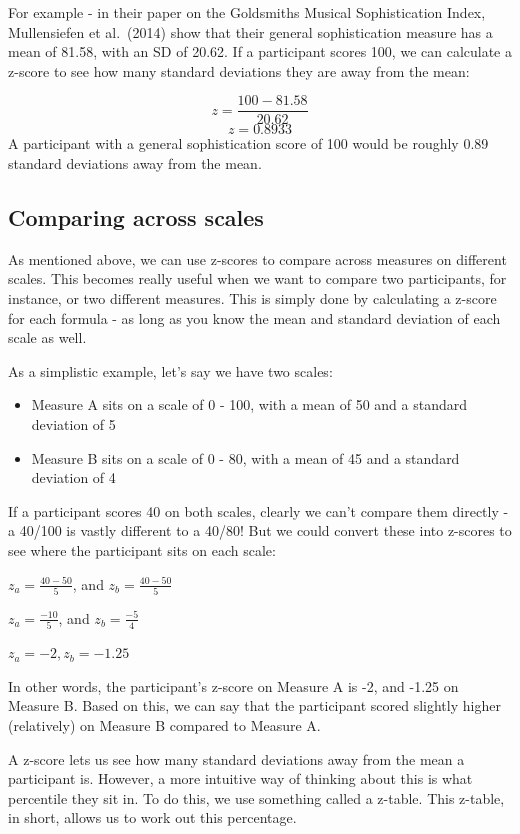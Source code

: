 \documentclass[
]{book}
\providecommand{\tightlist}{%
  \setlength{\itemsep}{0pt}\setlength{\parskip}{0pt}}
\begin{document}
For example - in their paper on the Goldsmiths Musical Sophistication Index, Mullensiefen et al.~(2014) show that their general sophistication measure has a mean of 81.58, with an SD of 20.62. If a participant scores 100, we can calculate a z-score to see how many standard deviations they are away from the mean:

\[
z = \frac{100 - 81.58}{20.62}
\]
\[
z = 0.8933
\]
A participant with a general sophistication score of 100 would be roughly 0.89 standard deviations away from the mean.

\hypertarget{comparing-across-scales}{%
\subsection{Comparing across scales}\label{comparing-across-scales}}

As mentioned above, we can use z-scores to compare across measures on different scales. This becomes really useful when we want to compare two participants, for instance, or two different measures. This is simply done by calculating a z-score for each formula - as long as you know the mean and standard deviation of each scale as well.

As a simplistic example, let's say we have two scales:

\begin{itemize}
\tightlist
\item
  Measure A sits on a scale of 0 - 100, with a mean of 50 and a standard deviation of 5
\item
  Measure B sits on a scale of 0 - 80, with a mean of 45 and a standard deviation of 4
\end{itemize}

If a participant scores 40 on both scales, clearly we can't compare them directly - a 40/100 is vastly different to a 40/80! But we could convert these into z-scores to see where the participant sits on each scale:

\(z_a = \frac{40 - 50}{5}\), and \(z_b = \frac{40 - 50}{5}\)

\(z_a = \frac{-10}{5}\), and \(z_b = \frac{-5}{4}\)

\(z_a = -2, z_b = -1.25\)

In other words, the participant's z-score on Measure A is -2, and -1.25 on Measure B. Based on this, we can say that the participant scored slightly higher (relatively) on Measure B compared to Measure A.

A z-score lets us see how many standard deviations away from the mean a participant is. However, a more intuitive way of thinking about this is what percentile they sit in. To do this, we use something called a z-table. This z-table, in short, allows us to work out this percentage.
\end{document}
